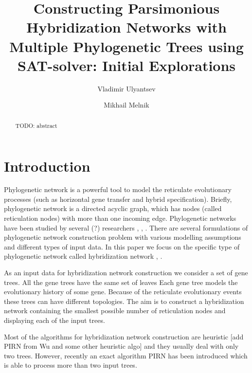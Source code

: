 \documentclass[runningheads, envcountsame, a4paper]{llncs}
\begin{document}
\mainmatter           
\title{Constructing Parsimonious Hybridization Networks with Multiple Phylogenetic Trees using SAT-solver: Initial Explorations}
\titlerunning{ } 
\toctitle{ }

\author{Vladimir Ulyantsev \and Mikhail Melnik}

\maketitle
\setcounter{footnote}{0}

\begin{abstract}
  TODO: abstract

\end{abstract}

\section{Introduction}

Phylogenetic network is a powerful tool to model the reticulate
evolutionary processes (such as horizontal gene transfer and hybrid specification).
Briefly, phylogenetic network is a directed acyclic graph, which has
nodes (called reticulation nodes) with more than one incoming edge. Phylogenetic
networks have been studied by several (?) researchers \cite{huson2010phylogenetic}, \cite{morrison2011introduction}, 
\cite{nakhleh2011evolutionary}. There are several formulations of phylogenetic network
construction problem with various modelling assumptions and different types of input data. 
In this paper we focus on the specific type of phylogenetic network called hybridization
network \cite{semple2006hybridization}, \cite{chen2010hybridnet}.

As an input data for hybridization network construction we consider a set of gene trees. 
All the gene trees have the same set of leaves
Each gene tree models the evolutionary history of some gene. 
Because of the reticulate evolutionary events these trees can have different topologies.
The aim is to construct a hybridization network containing the smallest possible number of 
reticulation nodes and displaying each of the input trees. 

Most of the algorithms for hybridization network construction are heuristic [add PIRN from Wu and some other heuristic algo] 
and they usually deal with only two trees.
However, recently an exact algorithm PIRN has been introduced \cite{wu2013algorithm} which is able to process more than two input trees.
\end{document}
